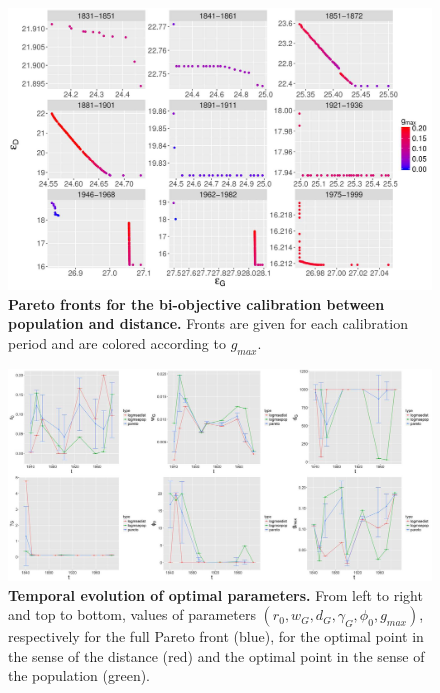 \begin{figure}
	\includegraphics[width=\linewidth]{figures/6-2-3-fig-macrocoevol-pareto.jpg}
	\caption[Pareto fronts for the calibration on population and distance]{\textbf{Pareto fronts for the bi-objective calibration between population and distance.} Fronts are given for each calibration period and are colored according to $g_{max}$.\label{fig:macrocoevol:pareto}}
\end{figure}




\begin{figure}
	\includegraphics[width=\linewidth]{figures/6-2-3-fig-macrocoevol-parameters.jpg}
	\caption[Evolution of calibrated parameters]{\textbf{Temporal evolution of optimal parameters.} From left to right and top to bottom, values of parameters $(r_0,w_G,d_G,\gamma_G,\phi_0,g_{max})$, respectively for the full Pareto front (blue), for the optimal point in the sense of the distance (red) and the optimal point in the sense of the population (green). \label{fig:macrocoevol:parameters}}
\end{figure}


